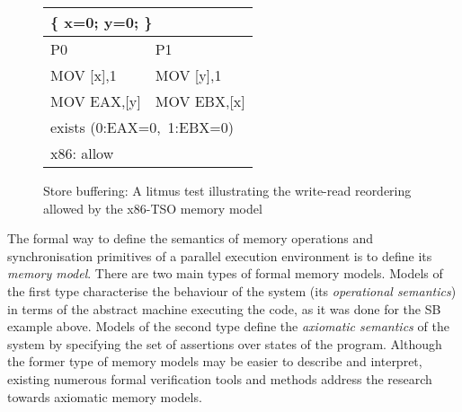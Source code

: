 \begin{figure}[t]
\centering
\ttfamily
\begin{tabular}{ |l|l| }
\hline
\multicolumn{2}{|l|}{ \{ x=0; y=0; \}} \tabularnewline \hline
P0 & P1 \\ \hline
MOV [x],1 & MOV [y],1 \\
MOV EAX,[y] & MOV EBX,[x] \\
\hline
\multicolumn{2}{|l|}{exists (0:EAX=0,~1:EBX=0)} \tabularnewline
\hline
\multicolumn{2}{|l|}{x86: allow} \tabularnewline
\hline
\end{tabular}
\caption{Store buffering: A litmus test illustrating the write-read reordering allowed by the x86-TSO memory model}
\label{simple_wmm_x86}
\end{figure}


The formal way to define the semantics of memory operations and synchronisation primitives of a parallel execution environment is to define its \textit{memory model}.
There are two main types of formal memory models.
Models of the first type characterise the behaviour of the system (its \textit{operational semantics}) in terms of the abstract machine executing the code, as it was done for the SB example above.
Models of the second type define the \textit{axiomatic semantics} of the system by specifying the set of assertions over states of the program.
Although the former type of memory models may be easier to describe and interpret, existing numerous formal verification tools and methods address the research towards axiomatic memory models.

